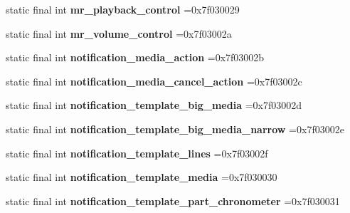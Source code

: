 \begin{DoxyCompactItemize}
static final int {\bfseries mr\+\_\+playback\+\_\+control} =0x7f030029
\item 
\mbox{\label{classproject4_1_1xaria_1_1R_1_1layout_aab190454b91422e84e9b0e2af2e0143a}} 
static final int {\bfseries mr\+\_\+volume\+\_\+control} =0x7f03002a
\item 
\mbox{\label{classproject4_1_1xaria_1_1R_1_1layout_adcd91dfe5d81efc79387727b1f2c7d60}} 
static final int {\bfseries notification\+\_\+media\+\_\+action} =0x7f03002b
\item 
\mbox{\label{classproject4_1_1xaria_1_1R_1_1layout_aa5e05df318e5682703989138c44356d4}} 
static final int {\bfseries notification\+\_\+media\+\_\+cancel\+\_\+action} =0x7f03002c
\item 
\mbox{\label{classproject4_1_1xaria_1_1R_1_1layout_ac5c9fc99c33470e218e590cf3bdeb2ca}} 
static final int {\bfseries notification\+\_\+template\+\_\+big\+\_\+media} =0x7f03002d
\item 
\mbox{\label{classproject4_1_1xaria_1_1R_1_1layout_afd1038d1449842147aea99fec725d59c}} 
static final int {\bfseries notification\+\_\+template\+\_\+big\+\_\+media\+\_\+narrow} =0x7f03002e
\item 
\mbox{\label{classproject4_1_1xaria_1_1R_1_1layout_a037c65ca9db67846caec38a49f5c321c}} 
static final int {\bfseries notification\+\_\+template\+\_\+lines} =0x7f03002f
\item 
\mbox{\label{classproject4_1_1xaria_1_1R_1_1layout_a22af60ab6658b172538f2f5b5262ad82}} 
static final int {\bfseries notification\+\_\+template\+\_\+media} =0x7f030030
\item 
\mbox{\label{classproject4_1_1xaria_1_1R_1_1layout_a4c9041ac05beb0df949cd7b040cef2b2}} 
static final int {\bfseries notification\+\_\+template\+\_\+part\+\_\+chronometer} =0x7f030031
\item 
\mbox{\label{classproject4_1_1xaria_1_1R_1_1layout_a01976e5db62209c9fafe48f83a3b3519}} 

\end{DoxyCompactItemize}

